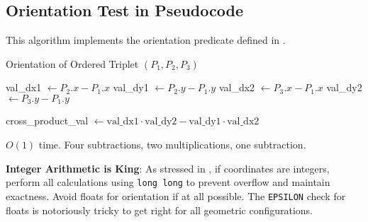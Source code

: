 \subsection{Orientation Test in Pseudocode}
\label{ssec:A.2.3}

This algorithm implements the orientation predicate defined in .

\begin{algorithm}[H]
\caption{Orientation of Ordered Triplet $(P_1, P_2, P_3)$}
\label{alg:A.2.3.orientation_test}
val\_dx1 $\leftarrow P_2.x - P_1.x$\;
val\_dy1 $\leftarrow P_2.y - P_1.y$\;
val\_dx2 $\leftarrow P_3.x - P_1.x$\;
val\_dy2 $\leftarrow P_3.y - P_1.y$\;

cross\_product\_val $\leftarrow \text{val\_dx1} \cdot \text{val\_dy2} - \text{val\_dy1} \cdot \text{val\_dx2}$\;

 {
     
}
 {
     
}

 {
     
} 
\end{algorithm}
\begin{complexity}
\label{comp:A.2.3.orientation_test}
$O(1)$ time. Four subtractions, two multiplications, one subtraction.
\end{complexity}
\begin{tipsbox}
\label{tips:A.2.3.integer_orientation}
\textbf{Integer Arithmetic is King}: As stressed in , if coordinates are integers, perform all calculations using \texttt{long long} to prevent overflow and maintain exactness. Avoid floats for orientation if at all possible. The \texttt{EPSILON} check for floats is notoriously tricky to get right for all geometric configurations.
\end{tipsbox}

